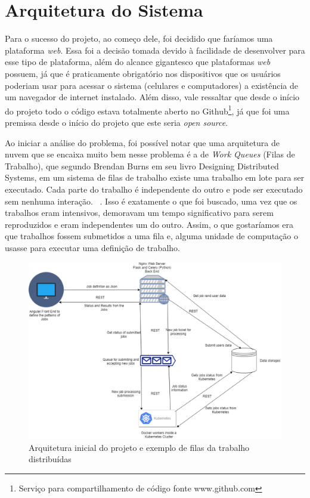 \documentclass[11pt,twoside]{article}
\begin{document}
\section{Arquitetura do Sistema}
Para o sucesso do projeto, ao começo dele, foi decidido que faríamos uma plataforma \emph{web}. Essa foi a decisão tomada devido à facilidade de desenvolver para esse tipo de plataforma, além do alcance
gigantesco que plataformas \emph{web} possuem, já que é praticamente obrigatório nos dispositivos que os usuários poderiam usar para acessar o sistema (celulares e computadores) a existência de um
navegador de internet instalado. Além disso, vale ressaltar que desde o início do projeto todo o código estava totalmente aberto no Github\footnote{Serviço para compartilhamento de código fonte www.github.com}, 
já que foi uma premissa desde o início do projeto que este seria \emph{open source}.

Ao iniciar a análise do problema, foi possível notar que uma arquitetura de nuvem que se encaixa muito bem nesse problema é a de \emph{Work Queues} (Filas de Trabalho), que segundo Brendan Burns em seu livro
Designing Distributed Systems, em um sistema de filas de trabalho existe uma trabalho em lote para ser executado. Cada parte do trabalho é independente do outro e pode ser executado sem nenhuma interação. 
~\cite{BB}.
Isso é exatamente o que foi buscado, uma vez que os trabalhos eram intensivos, demoravam um tempo significativo para serem reproduzidos e eram independentes um do outro. Assim, o que gostaríamos era que trabalhos fossem submetidos
a uma fila e, alguma unidade de computação o usasse para executar uma definição de trabalho.

\begin{figure}[!h]
  \centering
  \includegraphics[scale=0.4]{arch.eps}
  \caption{Arquitetura inicial do projeto e exemplo de filas da trabalho distribuídas}
  \label{fig:archtec}
\end{figure}
\end{document}
